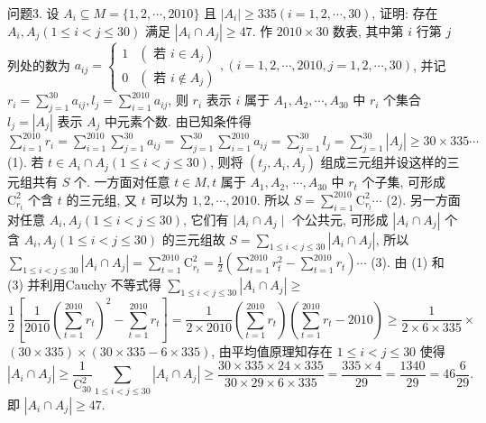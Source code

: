 问题3. 设 $A_i \subseteq M=\{1,2, \cdots, 2010\}$ 且 $\left|A_i\right| \geqslant 335(i=1,2, \cdots, 30)$, 证明: 存在 $A_i, A_j(1 \leqslant i<j \leqslant 30)$ 满足 $\left|A_i \cap A_j\right| \geqslant 47$.
作 $2010 \times 30$ 数表, 其中第 $i$ 行第 $j$ 列处的数为 $a_{i j}= \left\{\begin{array}{ll}1 & \left(\text { 若 } i \in A_j\right) \\ 0 & \left(\text { 若 } i \notin A_j\right)\end{array},(i=1,2, \cdots, 2010, j=1,2, \cdots, 30)\right.$, 并记 $r_i= \sum_{j=1}^{30} a_{i j}, l_j=\sum_{i=1}^{2010} a_{i j}$, 则 $r_i$ 表示 $i$ 属于 $A_1, A_2, \cdots, A_{30}$ 中 $r_i$ 个集合 $l_j=\left|A_j\right|$ 表示 $A_j$ 中元素个数.
由已知条件得 $\sum_{i=1}^{2010} r_i=\sum_{i=1}^{2010} \sum_{j=1}^{30} a_{i j}=\sum_{j=1}^{30} \sum_{i=1}^{2010} a_{i j}=\sum_{j=1}^{30} l_j= \sum_{j=1}^{30}\left|A_j\right| \geqslant 30 \times 335 \cdots$ (1). 
若 $t \in A_i \cap A_j(1 \leqslant i<j \leqslant 30)$, 则将 $\left(t_j, A_i, A_j\right)$ 组成三元组并设这样的三元组共有 $S$ 个.
一方面对任意 $t \in M, t$ 属于 $A_1, A_2$, $\cdots, A_{30}$ 中 $r_t$ 个子集, 可形成 $\mathrm{C}_{r_t}^2$ 个含 $t$ 的三元组, 又 $t$ 可以为 $1,2, \cdots, 2010$. 所以 $S=\sum_{i=1}^{2010} \mathrm{C}_{r_l}^2 \cdots$ (2). 
另一方面对任意 $A_i, A_j(1 \leqslant i<j \leqslant 30)$, 它们有 $\mid A_i \cap A_j \mid$ 个公共元, 可形成 $\left|A_i \cap A_j\right|$ 个含 $A_i, A_j(1 \leqslant i<j \leqslant 30)$ 的三元组故 $S=\sum_{1 \leqslant i<j \leqslant 30}\left|A_i \cap A_j\right|$, 所以 $\sum_{1 \leqslant i<j \leqslant 30}\left|A_i \cap A_j\right|=\sum_{t=1}^{2010} \mathrm{C}_{r_t}^2= \frac{1}{2}\left(\sum_{t=1}^{2010} r_t^2-\sum_{t=1}^{2010} r_t\right) \cdots$ (3). 
由 (1) 和 (3) 并利用Cauchy 不等式得 $\sum_{1 \leqslant i<j \leqslant 30}\left|A_i \cap A_j\right| \geqslant$
$$
\frac{1}{2}\left[\frac{1}{2010}\left(\sum_{t=1}^{2010} r_t\right)^2-\sum_{t=1}^{2010} r_t\right]=\frac{1}{2 \times 2010}\left(\sum_{t=1}^{2010} r_t\right)\left(\sum_{t=1}^{2010} r_t-2010\right) \geqslant \frac{1}{2 \times 6 \times 335} \times
$$
$(30 \times 335) \times(30 \times 335-6 \times 335)$, 由平均值原理知存在 $1 \leqslant i<j \leqslant 30$ 使得
$$
\left|A_i \cap A_j\right| \geqslant \frac{1}{\mathrm{C}_{30}^2} \sum_{1 \leqslant i<j \leqslant 30}\left|A_i \cap A_j\right| \geqslant \frac{30 \times 335 \times 24 \times 335}{30 \times 29 \times 6 \times 335}=\frac{335 \times 4}{29}=\frac{1340}{29}=46 \frac{6}{29} \text {. }
$$
即 $\left|A_i \cap A_j\right| \geqslant 47$.




